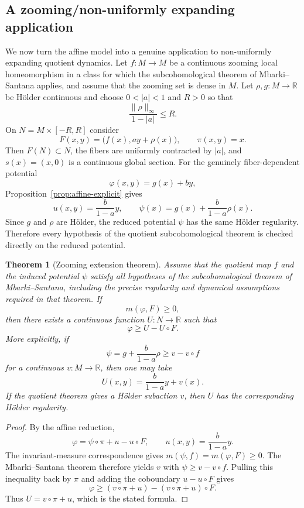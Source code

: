 \documentclass[11pt,a4paper]{article}
\newtheorem{theorem}{Theorem}[section]
\begin{document}
\subsection{A zooming/non-uniformly expanding application}\label{subsec:zooming-application}

We now turn the affine model into a genuine application to non-uniformly
expanding quotient dynamics. Let $f:M\to M$ be a continuous zooming local
homeomorphism in a class for which the subcohomological theorem of Mbarki--
Santana applies, and assume that the zooming set is dense in $M$. Let
$\rho,g:M\to\mathbb R$ be H\"older continuous and choose $0<|a|<1$ and
$R>0$ so that
\[
\frac{\|\rho\|_\infty}{1-|a|}\le R.
\]
On $N=M\times[-R,R]$ consider
\[
F(x,y)=\bigl(f(x),ay+\rho(x)\bigr),
\qquad \pi(x,y)=x.
\]
Then $F(N)\subset N$, the fibers are uniformly contracted by $|a|$, and
$s(x)=(x,0)$ is a continuous global section. For the genuinely fiber-dependent
potential
\[
\varphi(x,y)=g(x)+by,
\]
Proposition~\ref{prop:affine-explicit} gives
\[
 u(x,y)=\frac{b}{1-a}y,
 \qquad
 \psi(x)=g(x)+\frac{b}{1-a}\rho(x).
\]
Since $g$ and $\rho$ are H\"older, the reduced potential $\psi$ has the
same H\"older regularity. Therefore every hypothesis of the quotient
subcohomological theorem is checked directly on the reduced potential.

\begin{theorem}[Zooming extension theorem]
\label{thm:zooming-extension}
Assume that the quotient map $f$ and the induced potential $\psi$ satisfy
all hypotheses of the subcohomological theorem of Mbarki--Santana, including
the precise regularity and dynamical assumptions required in that theorem. If
\[
m(\varphi,F)\ge0,
\]
then there exists a continuous function $U:N\to\mathbb R$ such that
\[
\varphi\ge U-U\circ F.
\]
More explicitly, if
\[
\psi=g+\frac{b}{1-a}\rho
\ge v-v\circ f
\]
for a continuous $v:M\to\mathbb R$, then one may take
\[
\boxed{U(x,y)=\frac{b}{1-a}y+v(x).}
\]
If the quotient theorem gives a H\"older subaction $v$, then $U$ has the
corresponding H\"older regularity.
\end{theorem}

\begin{proof}
By the affine reduction,
\[
\varphi=\psi\circ\pi+u-u\circ F,
\qquad u(x,y)=\frac{b}{1-a}y.
\]
The invariant-measure correspondence gives
$m(\psi,f)=m(\varphi,F)\ge0$. The Mbarki--Santana theorem therefore yields
$v$ with $\psi\ge v-v\circ f$. Pulling this inequality back by $\pi$ and
adding the coboundary $u-u\circ F$ gives
\[
\varphi\ge (v\circ\pi+u)-(v\circ\pi+u)\circ F.
\]
Thus $U=v\circ\pi+u$, which is the stated formula.
\end{proof}
\end{document}
